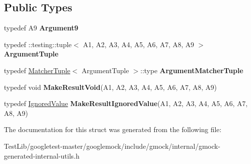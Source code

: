 \subsection*{Public Types}
\begin{DoxyCompactItemize}
\item 
\mbox{\label{structtesting_1_1internal_1_1Function_3_01R_07A1_00_01A2_00_01A3_00_01A4_00_01A5_00_01A6_00_01A7_00_01A8_00_01A9_08_4_a38763fd0186335e863f105ef07c24e7e}} 
typedef A9 {\bfseries Argument9}
\item 
\mbox{\label{structtesting_1_1internal_1_1Function_3_01R_07A1_00_01A2_00_01A3_00_01A4_00_01A5_00_01A6_00_01A7_00_01A8_00_01A9_08_4_a184a525db51d0008a93b6c9ccf0d84e9}} 
typedef \+::testing\+::tuple$<$ A1, A2, A3, A4, A5, A6, A7, A8, A9 $>$ {\bfseries Argument\+Tuple}
\item 
\mbox{\label{structtesting_1_1internal_1_1Function_3_01R_07A1_00_01A2_00_01A3_00_01A4_00_01A5_00_01A6_00_01A7_00_01A8_00_01A9_08_4_a8db40584fce5a62969219c25e40ff307}} 
typedef \hyperlink{structtesting_1_1internal_1_1MatcherTuple}{Matcher\+Tuple}$<$ Argument\+Tuple $>$\+::type {\bfseries Argument\+Matcher\+Tuple}
\item 
\mbox{\label{structtesting_1_1internal_1_1Function_3_01R_07A1_00_01A2_00_01A3_00_01A4_00_01A5_00_01A6_00_01A7_00_01A8_00_01A9_08_4_a22fab485f015d9ddd119279fb6d253cc}} 
typedef void {\bfseries Make\+Result\+Void}(A1, A2, A3, A4, A5, A6, A7, A8, A9)
\item 
\mbox{\label{structtesting_1_1internal_1_1Function_3_01R_07A1_00_01A2_00_01A3_00_01A4_00_01A5_00_01A6_00_01A7_00_01A8_00_01A9_08_4_a32f168fe643707462ca621fc8c5dff2a}} 
typedef \hyperlink{classtesting_1_1internal_1_1IgnoredValue}{Ignored\+Value} {\bfseries Make\+Result\+Ignored\+Value}(A1, A2, A3, A4, A5, A6, A7, A8, A9)
\end{DoxyCompactItemize}


The documentation for this struct was generated from the following file\+:\begin{DoxyCompactItemize}
\item 
Test\+Lib/googletest-\/master/googlemock/include/gmock/internal/gmock-\/generated-\/internal-\/utils.\+h\end{DoxyCompactItemize}
